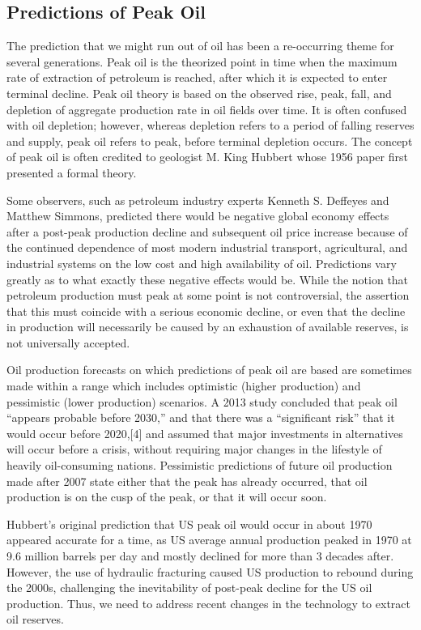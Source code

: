 \subsection{Predictions of Peak Oil}

The prediction that we might run out of oil has been a re-occurring theme for several generations. Peak oil is the theorized point in time when the maximum rate of extraction of petroleum is reached, after which it is expected to enter terminal decline. Peak oil theory is based on the observed rise, peak, fall, and depletion of aggregate production rate in oil fields over time. It is often confused with oil depletion; however, whereas depletion refers to a period of falling reserves and supply, peak oil refers to peak, before terminal depletion occurs. The concept of peak oil is often credited to geologist M. King Hubbert whose 1956 paper first presented a formal theory.

Some observers, such as petroleum industry experts Kenneth S. Deffeyes and Matthew Simmons, predicted there would be negative global economy effects after a post-peak production decline and subsequent oil price increase because of the continued dependence of most modern industrial transport, agricultural, and industrial systems on the low cost and high availability of oil. Predictions vary greatly as to what exactly these negative effects would be. While the notion that petroleum production must peak at some point is not controversial, the assertion that this must coincide with a serious economic decline, or even that the decline in production will necessarily be caused by an exhaustion of available reserves, is not universally accepted.

Oil production forecasts on which predictions of peak oil are based are sometimes made within a range which includes optimistic (higher production) and pessimistic (lower production) scenarios. A 2013 study concluded that peak oil ``appears probable before 2030,'' and that there was a ``significant risk'' that it would occur before 2020,[4] and assumed that major investments in alternatives will occur before a crisis, without requiring major changes in the lifestyle of heavily oil-consuming nations. Pessimistic predictions of future oil production made after 2007 state either that the peak has already occurred, that oil production is on the cusp of the peak, or that it will occur soon.

Hubbert's original prediction that US peak oil would occur in about 1970 appeared accurate for a time, as US average annual production peaked in 1970 at 9.6 million barrels per day and mostly declined for more than 3 decades after. However, the use of hydraulic fracturing caused US production to rebound during the 2000s, challenging the inevitability of post-peak decline for the US oil production. Thus, we need to address recent changes in the technology to extract oil reserves.

